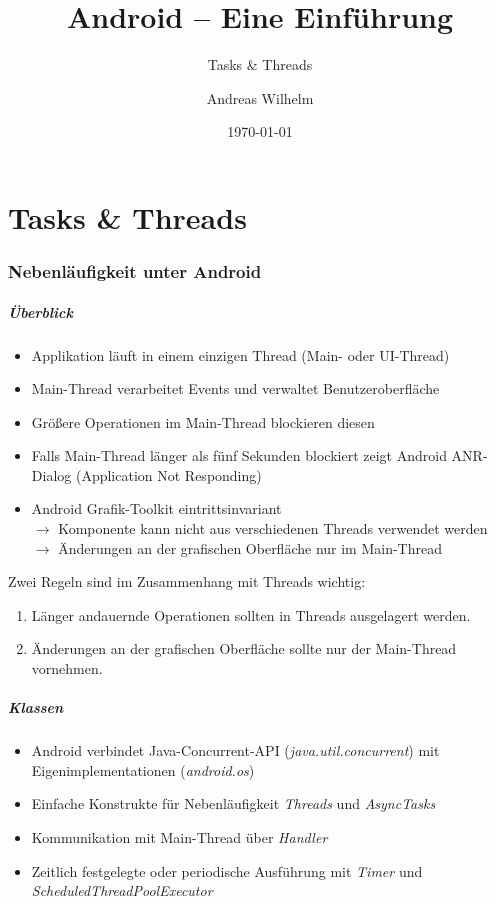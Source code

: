 \title{Android -- Eine Einführung}
\subtitle{Tasks \& Threads}
\author[A. Wilhelm]{Andreas Wilhelm}
\titlegraphic{}
\date{\today}

\begin{frame}[plain]
  \titlepage
\end{frame}

\part{Tasks \& Threads}

\section{Nebenläufigkeit unter Android}
\begin{frame}
   \frametitle{Überblick}
   \begin{itemize}
      \item Applikation läuft in einem einzigen Thread (Main- oder UI-Thread)
      \item Main-Thread verarbeitet Events und verwaltet Benutzeroberfläche
      \item Größere Operationen im Main-Thread blockieren diesen
      \item Falls Main-Thread länger als fünf Sekunden blockiert zeigt Android 
      	ANR-Dialog (Application Not Responding)
      \item Android Grafik-Toolkit eintrittsinvariant\\
      	$\rightarrow$ Komponente kann nicht aus verschiedenen Threads verwendet werden\\
      	$\rightarrow$ Änderungen an der grafischen Oberfläche nur im Main-Thread
   \end{itemize}
   
   Zwei Regeln sind im Zusammenhang mit Threads wichtig:
   \begin{enumerate}
		\item Länger andauernde Operationen sollten in Threads ausgelagert werden.
		\item Änderungen an der grafischen Oberfläche sollte nur der Main-Thread vornehmen.
	\end{enumerate}
\end{frame}

\begin{frame}
   \frametitle{Klassen}
   \begin{itemize}
      \item Android verbindet Java-Concurrent-API (\emph{java.util.concurrent}) 
      	mit Eigenimplementationen (\emph{android.os}) 
		\item Einfache Konstrukte für Nebenläufigkeit \emph{Threads} und \emph{AsyncTasks}
		\item Kommunikation mit Main-Thread über \emph{Handler}
		\item Zeitlich festgelegte oder periodische Ausführung mit 
			\emph{Timer} und \emph{ScheduledThreadPoolExecutor}
   \end{itemize}
\end{frame}

